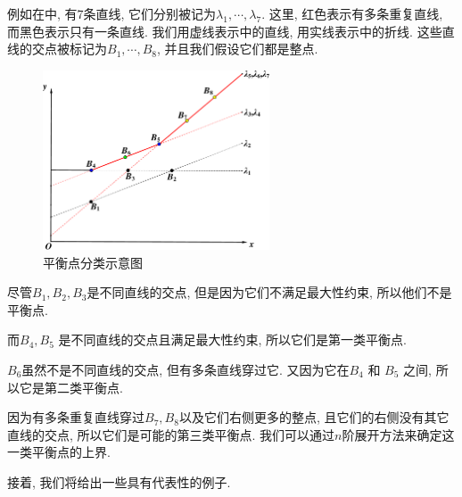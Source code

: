 例如在中, 有7条直线, 它们分别被记为$\lambda_1,\cdots,\lambda_7$. 这里, 红色表示有多条重复直线, 而黑色表示只有一条直线. 我们用虚线表示中的直线, 用实线表示中的折线. 这些直线的交点被标记为$B_1,\cdots,B_8$, 并且我们假设它们都是整点. 
\begin{figure}[htbp]
\centering
\includegraphics[width=0.6\textwidth]{fig/ps.pdf}
\caption{平衡点分类示意图}
\label{point}
\end{figure}
\begin{compactitem}[\textbullet]
\item 尽管$B_1,B_2,B_3$是不同直线的交点, 但是因为它们不满足最大性约束, 所以他们不是平衡点. 
\item 而$B_4,B_5$ 是不同直线的交点且满足最大性约束, 所以它们是第一类平衡点.
\item $B_6$虽然不是不同直线的交点, 但有多条直线穿过它. 又因为它在$B_4$ 和 $B_5$ 之间, 所以它是第二类平衡点.
\item 因为有多条重复直线穿过$B_7,B_8$以及它们右侧更多的整点, 且它们的右侧没有其它直线的交点, 所以它们是可能的第三类平衡点. 我们可以通过$n$阶展开方法来确定这一类平衡点的上界.
\end{compactitem}

接着, 我们将给出一些具有代表性的例子. 

